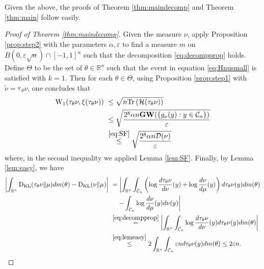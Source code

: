 \documentclass[12pt]{article}
\def \tilt{ \mathrm{\tau} }
\def \W{\mathrm{W_1}}
\def \RR {\mathbb R}
\def \eps {\varepsilon}
\def \tr {\mathrm{Tr}}
\def \DC {\mathcal{C}_n}
\def \MW {\mathbf{GW}}
\def \KL {\mathrm{D}_{\mathrm{KL}}}
\def \HH {\mathcal{H}}
\def \Comp { \mathcal{D} }
\theoremstyle{definition}
\theoremstyle{remark}
\begin{document}
Given the above, the proofs of Theorem \ref{thm:maindecomp} and Theorem \ref{thm:main} follow easily. 

\begin{proof}[Proof of Theorem \ref{thm:maindecomp}]
Given the measure $\nu$, apply Proposition \ref{prop:step2} with the parameters $\alpha, \eps$ to find a measure $m$ on $B(0,\eps \sqrt{n}) \cap [-1,1]^n$ such that the decomposition \eqref{eq:decompprop} holds. Define $\Theta$ to be the set of $\theta \in \RR^n$ such that the event in equation \eqref{eq:Hnusmall} is satisfied with $k=1$. Then for each $\theta \in \Theta$, using Proposition \ref{prop:step1} with $\tilde \nu = \tilt_\theta \nu$, one concludes that
\begin{align*}
\W(\tilt_\theta \nu, \xi(\tilt_\theta \nu)) ~& \leq \sqrt{n \tr \left ( \HH(\tilt_\theta \nu) \right )} \\
& \leq \sqrt{\frac{ 2^8 \alpha n \MW( \{ g_\nu(y): y \in \DC \} ) }{\eps}} \\
& \stackrel{\eqref{eq:SF}}{\leq} \sqrt{\frac{2^8 \alpha n \Comp(\nu) }{\eps}}
\end{align*}
where, in the second inequality we applied Lemma \ref{lem:SF}. Finally, by Lemma \ref{lem:easy}, we have
\begin{align*}
\left | \int_{\RR^n} \KL(\tilt_\theta \nu \Vert \mu)  d m(\theta) - \KL(\nu \Vert \mu) \right | ~& = \left |\int_{\RR^n} \int_{\DC} \left ( \log \frac{d \tilt_\theta \nu}{d \nu} (y) +\log \frac{d \nu}{d \mu} (y) \right ) d \tilt_\theta \nu(y) d m(\theta) \right . \\ &~~~  \left . - \int_{\DC} \log \frac{d \nu}{d \mu} (y) d \nu(y) \right | \\
& \stackrel{\eqref{eq:decompprop}}{=} \left |\int_{\RR^n} \int_{\DC} \log \frac{d \tilt_\theta \nu}{d \nu} (y) d \tilt_\theta \nu(y) d m(\theta)  \right |\\ 
 & \stackrel{ \eqref{eq:lemeasy}}{\leq} 2 \int_{\RR^n} \int_{\DC} \eps n d \tilt_\theta \nu(y) d m(\theta) \leq 2 \eps n.
\end{align*}
\end{proof}
\end{document}
